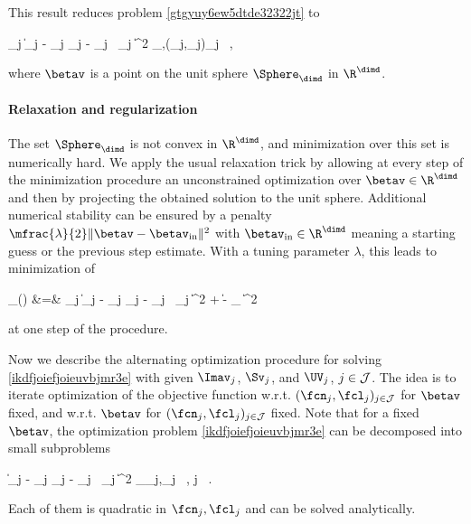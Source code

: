 This result reduces problem \eqref{gtgyuy6ew5dtde32322jt} to
\begin{EQA}[c]
	\sum_{j \in \JJJ} \bigl\| \Imav_{j} - \fcn_{j} \Sv_{j} - \fcl_{j} \, \UV_{j} \betav \bigr\|^{2}
	\to
	\inf_{\betav,(\fcn_{j},\fcl_{j})_{j \in \JJJ}}
	\, ,
\label{ikdfjoiefjoieuvbjmr3e}
\end{EQA}
where \( \betav \) is a point on the unit sphere \( \Sphere_{\dimd} \) in \( \R^{\dimd} \).

\paragraph{Relaxation and regularization}
The set \( \Sphere_{\dimd} \) is not convex in \( \R^{\dimd} \), 
and minimization over this set is numerically hard.
We apply the usual relaxation trick by allowing at every step of the minimization procedure 
an unconstrained optimization over \( \betav \in \R^{\dimd} \) and then by projecting 
the obtained solution to the unit sphere.
Additional numerical stability can be ensured 
by a penalty \( \mfrac{\lambda}{2} \| \betav - \betav_{\init} \|^{2} \) with 
\( \betav_{\init} \in \R^{\dimd} \)
meaning a starting guess or the previous step estimate.
With a tuning parameter \( \lambda \), this leads to minimization of
\begin{EQA}
	\LL_{\lambda}(\prmtv)
	&=&
	 \sum_{j \in \JJJ} \bigl\| \Imav_{j} - \fcn_{j} \Sv_{j} - \fcl_{j} \, \UV_{j} \betav \bigr\|^{2} 
	+  \| \betav - \betav_{\init} \|^{2} 
	\, 
\label{tjjc7c6f5fd5e5erjwyhfd}
\end{EQA}
at one step of the procedure.
%

\label{SLLaltern}
Now we describe the alternating optimization procedure for solving \eqref{ikdfjoiefjoieuvbjmr3e}
with given \( \Imav_{j} \), \( \Sv_{j} \), and \( \UV_{j} \), \( j \in \mathcal{J} \).
The idea is to iterate optimization of the objective function w.r.t. 
\( (\fcn_{j},\fcl_{j})_{j \in \JJJ} \) for \( \betav \) fixed,
and w.r.t. \( \betav \) for \( (\fcn_{j},\fcl_{j})_{j \in \JJJ} \) fixed.
Note that for a fixed \( \betav \), the optimization problem \eqref{ikdfjoiefjoieuvbjmr3e}
can be decomposed into small subproblems 
\begin{EQA}[c]
	\bigl\| \Imav_{j} - \fcn_{j} \Sv_{j} - \fcl_{j} \, \UV_{j} \betav \bigr\|^{2}
	\to \inf_{\fcn_{j},\fcl_{j}}
	\, ,
	\qquad
	j \in \JJJ
	\, .
\end{EQA}
Each of them is quadratic in \( \fcn_{j},\fcl_{j} \) and can be solved analytically.

